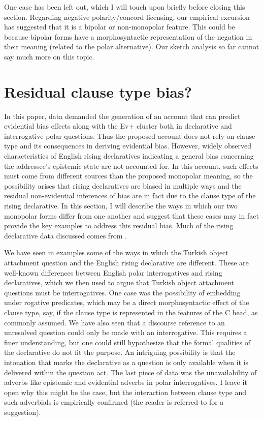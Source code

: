 \documentclass[output=paper,colorlinks,citecolor=brown]{langscibook}
\begin{document}
One case has been left out, which I will touch upon briefly before closing this section. Regarding negative polarity/concord licensing, our empirical excursion has suggested that it is a bipolar or non-monopolar feature. This could be because bipolar forms have a morphosyntactic representation of the negation in their meaning (related to the polar alternative). Our sketch analysis so far cannot say much more on this topic. 

\section{Residual clause type bias?}\label{sec:11:4}

In this paper, data demanded the generation of an account that can predict evidential bias effects along with the Ev+ cluster both in declarative and interrogative polar questions. Thus the proposed account does not rely on clause type and its consequences in deriving evidential bias. However, widely observed characteristics of English rising declaratives indicating a general bias concerning the addressee's epistemic state are not accounted for. In this account, such effects must come from different sources than the proposed monopolar meaning, so the possibility arises that rising declaratives are biased in multiple ways and the residual non-evidential inferences of bias are in fact due to the clause type of the rising declarative. In this section, I will describe the ways in which our two monopolar forms differ from one another and suggest that these cases may in fact provide the key examples to address this residual bias. Much of the rising declarative data discussed comes from \citet{gunlogson}.

We have seen in examples  some of the ways in which the Turkish object attachment question and the English rising declarative are different. These are well-known differences between English polar interrogatives and rising declaratives, which we then used to argue that Turkish object attachment questions must be interrogatives. One case was the possibility of embedding under rogative predicates, which may be a direct morphosyntactic effect of the clause type, say, if the clause type is represented in the features of the C head, as commonly assumed. We have also seen that a discourse reference to an unresolved question could only be made with an interrogative. This requires a finer understanding, but one could still hypothesize that the formal qualities of the declarative do not fit the purpose. An intriguing possibility is that the intonation that marks the declarative as a question is only available when it is delivered within the question act. The last piece of data was the unavailability of adverbs like epistemic and evidential adverbs in polar interrogatives. I leave it open why this might be the case, but the interaction between clause type and such adverbials is empirically confirmed (the reader is referred to \citealt{krifka21} for a suggestion).
\end{document}
